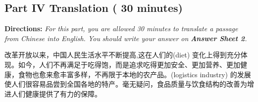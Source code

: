 \documentclass[UTF8,11pt]{ctexart}
\begin{document}
\subsection*{\textbf{Part IV Translation} \textbf{( 30 minutes)}}


\textbf{Directions: }\textit{For this part, you are allowed 30 minutes to translate a passage from Chinese into English. You} \textit{should write your answer on }\textbf{\textit{Answer Sheet 2}}\textit{.}


改革开放以来，中国人民生活水平不断提高,这在人们的(diet) 变化上得到充分体现。如今，人们不再满足于吃得饱，而是追求吃得更加安全、更加营养、更加健康，食物也愈来愈丰富多样，不再限于本地的农产品。(logistics industry) 的发展使人们很容易品尝到全国各地的特产。毫无疑问，食品质量与饮食结构的改善为增进人们健康提供了有力的保障。
\end{document}
